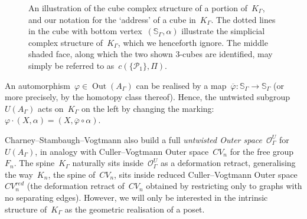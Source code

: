 \documentclass[11pt]{amsart}
\theoremstyle{definition}
\theoremstyle{definition}
\theoremstyle{definition}
\theoremstyle{definition}
\newcommand{\calP}{\mathcal{P}} %
\newcommand{\sal}{\mathbb{S}_{\Gamma}} %
\newcommand{\uag}{U(A_{\Gamma})} %
\newcommand{\oag}{\operatorname{Out}(A_{\Gamma})} %
\newcommand{\spine}{K_{\Gamma}} %
\begin{document}
\begin{figure}
\begin{center}
    \caption{An illustration of the cube complex structure of a portion of~$\spine$, and our notation for the `address' of a cube in~$\spine$. The dotted lines in the cube with bottom vertex~$(\sal, \alpha)$ illustrate the simplicial complex structure of~$\spine$, which we henceforth ignore. The middle shaded face, along which the two shown 3-cubes are identified, may simply be referred to as~$c\left(\{\calP_1\}, \Pi\right)$.}
    \label{fig:cube complex structure of the spine}
    \end{center}
\end{figure}

An automorphism~$\varphi \in \oag$ can be realised by a map~$\overline{\varphi}\colon \sal \to \sal$ (or more precisely, by the homotopy class thereof). Hence, the untwisted subgroup~$\uag$ acts on~$\spine$ on the left by changing the marking:~$\varphi \cdot (X, \alpha) = (X, \overline{\varphi} \circ \alpha)$.

Charney--Stambaugh--Vogtmann \cite{CharneyStambaughVogtmannUntwistedOuterSpace17} also build a full \emph{untwisted Outer space}~$\mathcal{O}_\Gamma^U$ for~$\uag$, in analogy with Culler--Vogtmann Outer space~$CV_n$ for the free group~$F_n$. The spine~$\spine$ naturally sits inside~$\mathcal{O}_\Gamma^U$ as a deformation retract, generalising the way~$K_n$, the spine of~$CV_n$, sits inside reduced Culler--Vogtmann Outer space~$CV_n^{red}$ (the deformation retract of~$CV_n$ obtained by restricting only to graphs with no separating edges). However, we will only be interested in the intrinsic structure of~$\spine$ as the geometric realisation of a poset.
\end{document}
